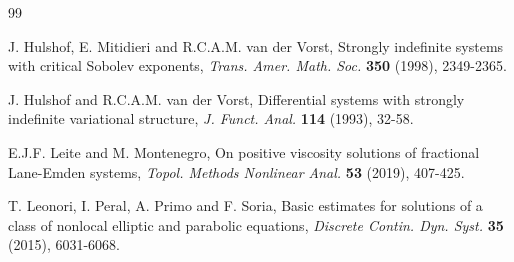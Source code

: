 \documentclass[10pt]{article}
\numberwithin{equation}{section}
\numberwithin{equation}{section}
\begin{document}
\begin{thebibliography}{99}

 J. Hulshof, E. Mitidieri and R.C.A.M. van der Vorst, Strongly indefinite systems with critical Sobolev exponents, {\it Trans. Amer. Math. Soc.} {\bf 350} (1998), 2349-2365.

 J. Hulshof and R.C.A.M. van der Vorst, Differential systems with strongly indefinite variational structure, {\it J. Funct. Anal.} {\bf 114} (1993), 32-58.






 E.J.F. Leite and M. Montenegro, On positive viscosity solutions of fractional Lane-Emden systems, {\it Topol. Methods Nonlinear Anal.} {\bf 53} (2019), 407-425.



 T. Leonori, I. Peral, A. Primo and F. Soria, Basic estimates for solutions of a class of nonlocal elliptic and parabolic equations, {\it Discrete Contin. Dyn. Syst.} {\bf 35} (2015), 6031-6068.


\end{thebibliography}
\end{document}
